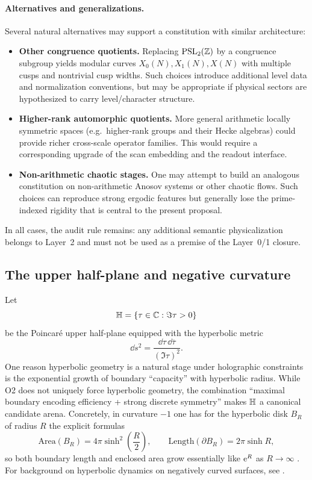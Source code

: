 \paragraph{Alternatives and generalizations.}
Several natural alternatives may support a constitution with similar architecture:
\begin{itemize}
  \item \textbf{Other congruence quotients.}
  Replacing $\mathrm{PSL}_2(\mathbb{Z})$ by a congruence subgroup yields modular curves $X_0(N),X_1(N),X(N)$ with multiple cusps and nontrivial cusp widths. Such choices introduce additional level data and normalization conventions, but may be appropriate if physical sectors are hypothesized to carry level/character structure.

  \item \textbf{Higher-rank automorphic quotients.}
  More general arithmetic locally symmetric spaces (e.g.\ higher-rank groups and their Hecke algebras) could provide richer cross-scale operator families. This would require a corresponding upgrade of the scan embedding and the readout interface.

  \item \textbf{Non-arithmetic chaotic stages.}
  One may attempt to build an analogous constitution on non-arithmetic Anosov systems or other chaotic flows. Such choices can reproduce strong ergodic features but generally lose the prime-indexed rigidity that is central to the present proposal.
\end{itemize}
In all cases, the audit rule remains: any additional semantic physicalization belongs to Layer~2 and must not be used as a premise of the Layer~0/1 closure.

\subsection{The upper half-plane and negative curvature}
\label{sec:upper_half_plane}

Let
\begin{equation}
\mathbb{H} = \{\tau\in\mathbb{C} : \Im \tau > 0\}
\end{equation}
be the Poincar\'e upper half-plane equipped with the hyperbolic metric
\begin{equation}
\dd s^2 = \frac{\dd\tau\,\dd\overline{\tau}}{(\Im \tau)^2}.
\end{equation}
One reason hyperbolic geometry is a natural stage under holographic constraints is the exponential growth of boundary ``capacity'' with hyperbolic radius. While O2 does not uniquely force hyperbolic geometry, the combination ``maximal boundary encoding efficiency + strong discrete symmetry'' makes $\mathbb{H}$ a canonical candidate arena.
Concretely, in curvature $-1$ one has for the hyperbolic disk $B_R$ of radius $R$ the explicit formulas
\begin{equation}
\mathrm{Area}(B_R)=4\pi\sinh^2\!\left(\frac{R}{2}\right),
\qquad
\mathrm{Length}(\partial B_R)=2\pi\sinh R,
\end{equation}
so both boundary length and enclosed area grow essentially like $\mathrm{e}^{R}$ as $R\to\infty$ \cite{Ratcliffe1994}.
For background on hyperbolic dynamics on negatively curved surfaces, see \cite{KatokHasselblatt1995}.

